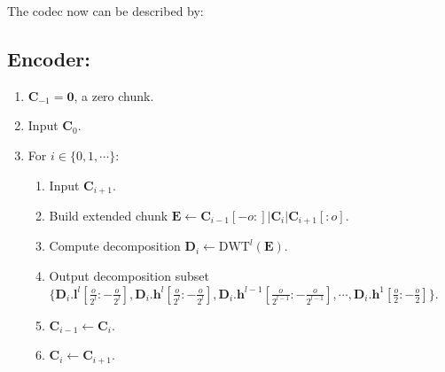 
The codec now can be described by:

\subsection*{Encoder:}
\begin{enumerate}
\item ${\mathbf C}_{-1}={\mathbf 0}$, a zero chunk.
\item Input ${\mathbf C}_0$.
\item For $i\in\{0,1,\cdots\}$:   
  \begin{enumerate}               
  \item Input ${\mathbf C}_{i+1}$.
  \item Build extended chunk ${\mathbf E}\leftarrow {\mathbf
    C}_{i-1}[-o:]|{\mathbf C}_i|{\mathbf C}_{i+1}[:o]$.
  \item Compute decomposition ${\mathbf D}_i \leftarrow
    \text{DWT}^l({\mathbf E})$.
  \item Output decomposition subset
    $\Big\{{\mathbf D}_i.{\mathbf l}^l[\frac{o}{2^l}:-\frac{o}{2^l}], {\mathbf
      D}_i.{\mathbf h}^l[\frac{o}{2^l}:-\frac{o}{2^l}], {\mathbf D}_i.{\mathbf
      h}^{l-1}[\frac{o}{2^{l-1}}:-\frac{o}{2^{l-1}}], \cdots, {\mathbf D}_i.{\mathbf
      h}^1[\frac{o}{2}:-\frac{o}{2}]\Big\}$.
  \item ${\mathbf C}_{i-1}\leftarrow {\mathbf C}_i$.
  \item ${\mathbf C}_i\leftarrow {\mathbf C}_{i+1}$.
  \end{enumerate}
\end{enumerate}


